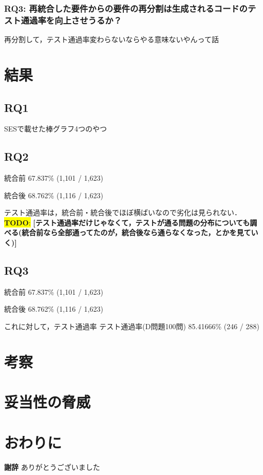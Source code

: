 \documentclass[submit,techrep,noauthor]{ipsj}
\newcommand{\todo}[1]{\colorbox{yellow}{{\bf TODO}:}{\color{red} {\textbf{[#1]}}}}
\begin{document}
\subsubsection{RQ3: 再統合した要件からの要件の再分割は生成されるコードのテスト通過率を向上させうるか？}
再分割して，テスト通過率変わらないならやる意味ないやんって話

\section{結果}

\subsection{RQ1}
SESで載せた棒グラフ4つのやつ

\subsection{RQ2}
統合前
67.837\% (1,101 / 1,623)

統合後
68.762\% (1,116 / 1,623)

テスト通過率は，統合前・統合後でほぼ横ばいなので劣化は見られない．
\todo{テスト通過率だけじゃなくて，テストが通る問題の分布についても調べる(統合前なら全部通ってたのが，統合後なら通らなくなった，とかを見ていく)}

\subsection{RQ3}
統合前
67.837\% (1,101 / 1,623)

統合後
68.762\% (1,116 / 1,623)

これに対して，テスト通過率
テスト通過率(D問題100問)
85.41666\% (246 / 288)

\section{考察}

\section{妥当性の脅威}

\section{おわりに}
\textbf{謝辞} ありがとうございました
\end{document}
